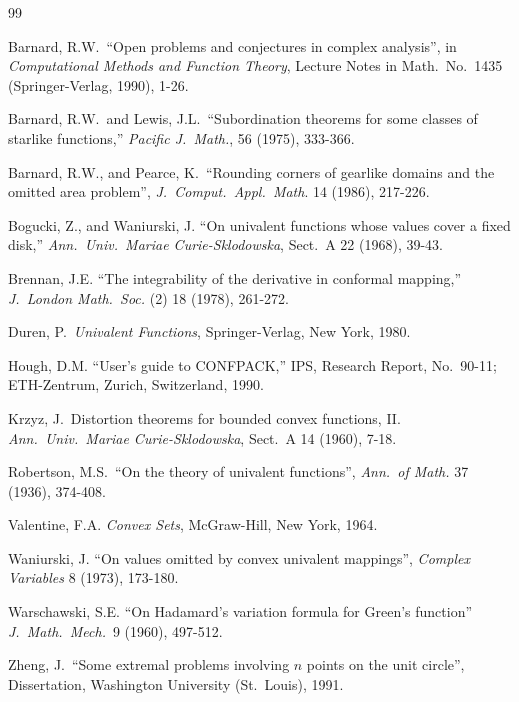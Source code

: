 \begin{thebibliography}{99}



 Barnard, R.W.\ ``Open problems and conjectures in complex
analysis'', in {\em Computational Methods and Function Theory},  Lecture
Notes in Math.\ No.\ 1435 (Springer-Verlag, 1990), 1-26.

 Barnard, R.W.\ and Lewis, J.L.\ ``Subordination theorems
for some classes of starlike functions,'' {\em Pacific J.\
Math.}, 56 (1975), 333-366.

 Barnard, R.W., and Pearce, K.\ ``Rounding corners of
gearlike domains and the omitted area problem'', {\em J.\ Comput.\ Appl.\
Math}. 14 (1986), 217-226.

 Bogucki, Z., and Waniurski, J. ``On univalent functions
whose values cover a fixed disk,'' {\em Ann.\ Univ.\ Mariae
Curie-Sklodowska}, Sect.\ A 22 (1968), 39-43.

 Brennan, J.E. ``The integrability of the derivative in
conformal mapping,'' {\em J.\ London Math.\ Soc.} (2) 18 (1978), 
261-272.

 Duren, P.\ {\em Univalent Functions},  Springer-Verlag,
New York, 1980.

 Hough, D.M. ``User's guide to CONFPACK,'' IPS, Research
Report, No.\ 90-11; ETH-Zentrum, Zurich, Switzerland, 1990.

 Krzyz, J.\ Distortion theorems for bounded convex
functions, II.  {\em Ann.\ Univ.\ Mariae Curie-Sklodowska}, Sect.\ A 14
(1960), 7-18.

 Robertson, M.S.\ ``On the theory of univalent functions'',
{\em Ann.\ of Math.} 37 (1936), 374-408.

 Valentine, F.A. {\em Convex Sets}, McGraw-Hill, New York, 1964.

\bibitem{wan} Waniurski, J. ``On values omitted by convex univalent
mappings'', {\em Complex Variables} 8 (1973), 173-180.

  Warschawski, S.E. ``On Hadamard's variation formula for
Green's function'' {\em J.\ Math.\ Mech.}\ 9 (1960), 497-512.

 Zheng, J.\ ``Some extremal problems
involving $n$ points on the unit circle'', Dissertation, 
Washington University (St.\ Louis), 1991.

\end{thebibliography}
